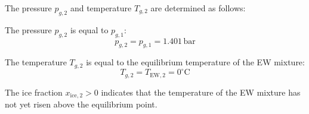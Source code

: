 The pressure \( p_{g,2} \) and temperature \( T_{g,2} \) are determined as follows:  

The pressure \( p_{g,2} \) is equal to \( p_{g,1} \):  
\[
p_{g,2} = p_{g,1} = 1.401 \, \text{bar}
\]  

The temperature \( T_{g,2} \) is equal to the equilibrium temperature of the EW mixture:  
\[
T_{g,2} = T_{\text{EW},2} = 0^\circ\text{C}
\]  

The ice fraction \( x_{\text{ice},2} > 0 \) indicates that the temperature of the EW mixture has not yet risen above the equilibrium point.